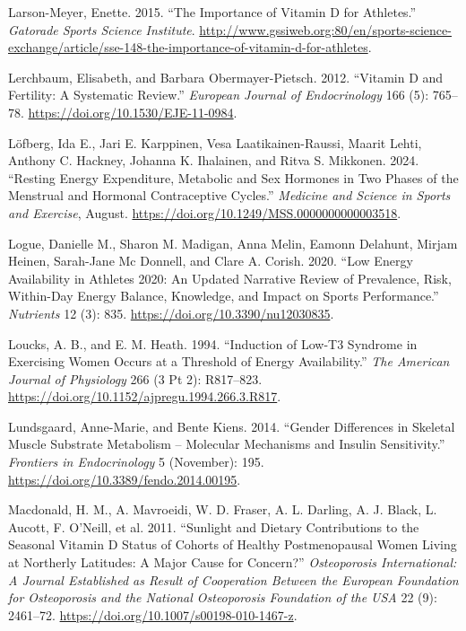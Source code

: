 \documentclass[
]{article}
\newlength{\cslhangindent}
\newenvironment{CSLReferences}[2] %
 {\begin{list}{}{%
  \setlength{\itemindent}{0pt}
  \setlength{\leftmargin}{0pt}
  \setlength{\parsep}{0pt}
  \ifodd #1
   \setlength{\leftmargin}{\cslhangindent}
   \setlength{\itemindent}{-1\cslhangindent}
  \fi
  \setlength{\itemsep}{#2\baselineskip}}}
 {\end{list}}
\begin{document}
\begin{CSLReferences}{1}{0}
Larson-Meyer, Enette. 2015. {``The {Importance} of {Vitamin} {D} for {Athletes}.''} \emph{Gatorade Sports Science Institute}. \url{http://www.gssiweb.org:80/en/sports-science-exchange/article/sse-148-the-importance-of-vitamin-d-for-athletes}.

Lerchbaum, Elisabeth, and Barbara Obermayer-Pietsch. 2012. {``Vitamin {D} and Fertility: A Systematic Review.''} \emph{European Journal of Endocrinology} 166 (5): 765--78. \url{https://doi.org/10.1530/EJE-11-0984}.

Löfberg, Ida E., Jari E. Karppinen, Vesa Laatikainen-Raussi, Maarit Lehti, Anthony C. Hackney, Johanna K. Ihalainen, and Ritva S. Mikkonen. 2024. {``Resting {Energy} {Expenditure}, {Metabolic} and {Sex} {Hormones} in {Two} {Phases} of the {Menstrual} and {Hormonal} {Contraceptive} {Cycles}.''} \emph{Medicine and Science in Sports and Exercise}, August. \url{https://doi.org/10.1249/MSS.0000000000003518}.

Logue, Danielle M., Sharon M. Madigan, Anna Melin, Eamonn Delahunt, Mirjam Heinen, Sarah-Jane Mc Donnell, and Clare A. Corish. 2020. {``Low {Energy} {Availability} in {Athletes} 2020: {An} {Updated} {Narrative} {Review} of {Prevalence}, {Risk}, {Within}-{Day} {Energy} {Balance}, {Knowledge}, and {Impact} on {Sports} {Performance}.''} \emph{Nutrients} 12 (3): 835. \url{https://doi.org/10.3390/nu12030835}.

Loucks, A. B., and E. M. Heath. 1994. {``Induction of Low-{T3} Syndrome in Exercising Women Occurs at a Threshold of Energy Availability.''} \emph{The American Journal of Physiology} 266 (3 Pt 2): R817--823. \url{https://doi.org/10.1152/ajpregu.1994.266.3.R817}.

Lundsgaard, Anne-Marie, and Bente Kiens. 2014. {``Gender {Differences} in {Skeletal} {Muscle} {Substrate} {Metabolism} -- {Molecular} {Mechanisms} and {Insulin} {Sensitivity}.''} \emph{Frontiers in Endocrinology} 5 (November): 195. \url{https://doi.org/10.3389/fendo.2014.00195}.

Macdonald, H. M., A. Mavroeidi, W. D. Fraser, A. L. Darling, A. J. Black, L. Aucott, F. O'Neill, et al. 2011. {``Sunlight and Dietary Contributions to the Seasonal Vitamin {D} Status of Cohorts of Healthy Postmenopausal Women Living at Northerly Latitudes: A Major Cause for Concern?''} \emph{Osteoporosis International: A Journal Established as Result of Cooperation Between the European Foundation for Osteoporosis and the National Osteoporosis Foundation of the USA} 22 (9): 2461--72. \url{https://doi.org/10.1007/s00198-010-1467-z}.


\end{CSLReferences}
\end{document}
